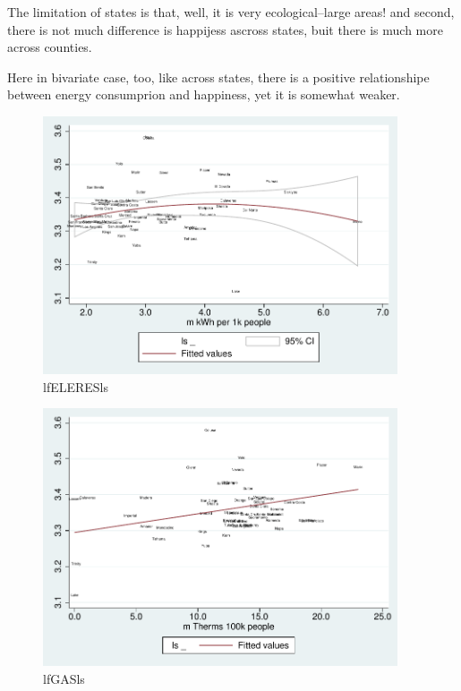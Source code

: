 \documentclass[10pt, letterpaper]{article}
\begin{document}
\begin{spacing}{1.4}
The limitation of states is that, well, it is very ecological--large areas! and
second, there is not much difference is happijess ascross states, buit there is
much more across counties. 

Here in bivariate case, too, like across states, there is a positive
relationshipe between energy consumprion and happiness, yet it is somewhat
weaker. 

\begin{figure}[H]
 \includegraphics[height=3in]{graphsAndTables/lfELERESls.pdf}\centering
\caption{lfELERESls}\label{lfELERESls}
\end{figure}

\begin{figure}[H]
 \includegraphics[height=3in]{graphsAndTables/lfGASls.pdf}\centering
\caption{lfGASls}\label{lfGASls}
\end{figure}




\end{spacing}
\end{document}
